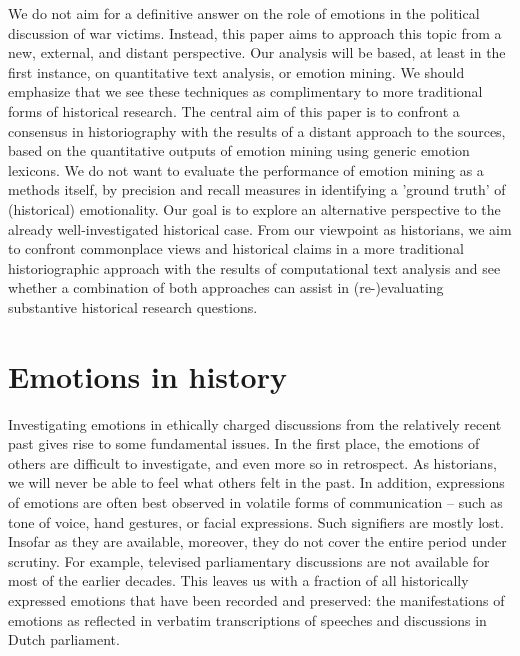 \documentclass{dhbenelux}
\begin{document}
We do not aim for a definitive answer on the role of emotions in the political discussion of war victims. Instead, this paper aims to approach this topic from a new, external, and distant perspective. Our analysis will be based, at least in the first instance, on quantitative text analysis, or emotion mining. We should emphasize that we see these techniques as complimentary to more traditional forms of historical research. The central aim of this paper is to confront a consensus in historiography with the results of a distant approach to the sources, based on the quantitative outputs of emotion mining using generic emotion lexicons. 
%
We do not want to evaluate the performance of emotion mining as a methods itself, 
by precision and recall measures in identifying a 'ground truth' of (historical) emotionality. Our goal is to explore an alternative perspective to the already well-investigated historical case. From our viewpoint as historians, we aim to confront commonplace views and historical claims in a more traditional historiographic approach with the results of computational text analysis and see whether a combination of both approaches can assist in (re-)evaluating substantive historical research questions.

\section{Emotions in history}
Investigating emotions in ethically charged discussions from the relatively recent past gives rise to some fundamental issues. In the first place, the emotions of others are difficult to investigate, and even more so in retrospect. As historians, we will never be able to feel what others felt in the past. In addition, expressions of emotions are often best observed in volatile forms of communication – such as tone of voice, hand gestures, or facial expressions. Such signifiers are mostly lost. Insofar as they are available, moreover, they do not cover the entire period under scrutiny. For example, televised parliamentary discussions are not available for most of the earlier decades. This leaves us with a fraction of all historically expressed emotions that have been recorded and preserved: the manifestations of emotions as reflected in verbatim transcriptions of speeches and discussions in Dutch parliament.
\end{document}
